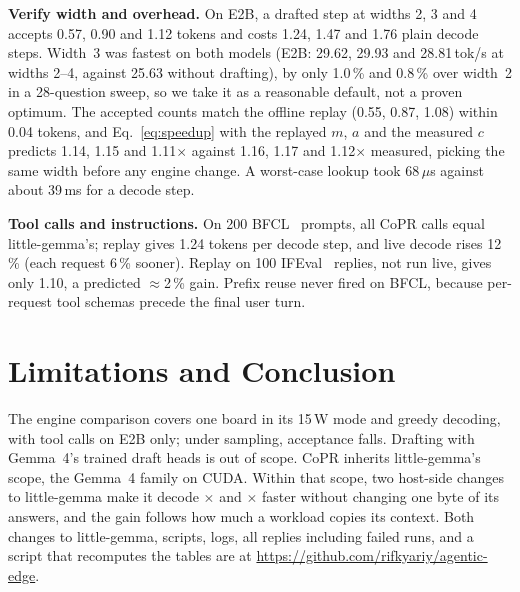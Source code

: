 \documentclass[lettersize,journal]{IEEEtran}
\newcommand{\sys}{CoPR}
\newcommand{\lgm}{little-gemma}
\begin{document}
\textbf{Verify width and overhead.} On E2B, a drafted step at widths 2, 3 and 4
accepts 0.57, 0.90 and 1.12 tokens and costs 1.24, 1.47 and 1.76 plain decode steps.
Width~3 was fastest on both models (E2B: 29.62, 29.93 and 28.81\,tok/s at widths
2--4, against 25.63 without drafting), by only 1.0\,\% and 0.8\,\% over width~2 in a
28-question sweep, so we take it as a reasonable default, not a proven optimum. The
accepted counts match the offline replay (0.55, 0.87, 1.08) within 0.04 tokens,
and Eq.~\eqref{eq:speedup} with the replayed $m$, $a$ and the measured $c$
predicts 1.14, 1.15 and 1.11$\times$ against 1.16, 1.17 and 1.12$\times$
measured, picking the same width before any engine change. A worst-case lookup
took 68\,$\mu$s against about 39\,ms for a decode step.

\textbf{Tool calls and instructions.} On 200 BFCL~\cite{bfcl}
prompts, all \sys{} calls equal \lgm{}'s; replay gives 1.24 tokens per decode
step, and live decode rises 12\,\% (each request 6\,\% sooner). Replay on 100
IFEval~\cite{ifeval} replies, not run live, gives only 1.10, a predicted
$\approx$2\,\% gain. Prefix reuse never fired on BFCL, because per-request tool
schemas precede the final user turn.

\section{Limitations and Conclusion}\label{sec:limits}
The engine comparison covers one board in its 15\,W mode and greedy decoding,
with tool calls on E2B only; under sampling, acceptance falls. Drafting with
Gemma~4's trained draft heads is out of scope. \sys{} inherits \lgm{}'s scope, the Gemma~4 family on CUDA. Within that
scope, two host-side changes to \lgm{} make it decode \EtwoSpG$\times$ and
\EfourSpG$\times$ faster without changing one byte of its answers, and the gain
follows how much a workload copies its context. Both changes to \lgm{}, scripts, logs, all
replies including failed runs, and a script that recomputes the tables are at
\url{https://github.com/rifkyariy/agentic-edge}.



\end{document}

